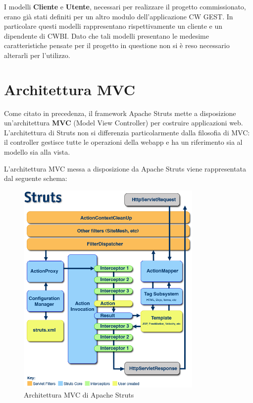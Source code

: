 \setlength{\parskip}{6ex}

\noindent I modelli \textbf{Cliente} e \textbf{Utente}, necessari per realizzare il progetto commissionato, erano già stati definiti per un altro modulo dell'applicazione CW GEST. In particolare questi modelli rappresentano rispettivamente un cliente e un dipendente di CWBI. Dato che tali modelli presentano le medesime caratteristiche pensate per il progetto in questione non si è reso necessario alterarli per l'utilizzo.

\pagebreak

\section{Architettura MVC}
Come citato in precedenza, il framework Apache Struts mette a disposizione un'architettura \textbf{MVC} (Model View Controller) per costruire applicazioni web. \\
L'architettura di Struts non si differenzia particolarmente dalla filosofia di MVC: il controller gestisce tutte le operazioni della webapp e ha un riferimento sia al modello sia alla vista. 

\setlength{\parskip}{3ex}

\noindent L'architettura MVC messa a disposizione da Apache Struts viene rappresentata dal seguente schema:

\begin{figure}[!h]
	\centering
	\includegraphics[width=9cm]{../images/MVC.png}
	\caption{Architettura MVC di Apache Struts}
	\label{fig:MVC}
\end{figure}

